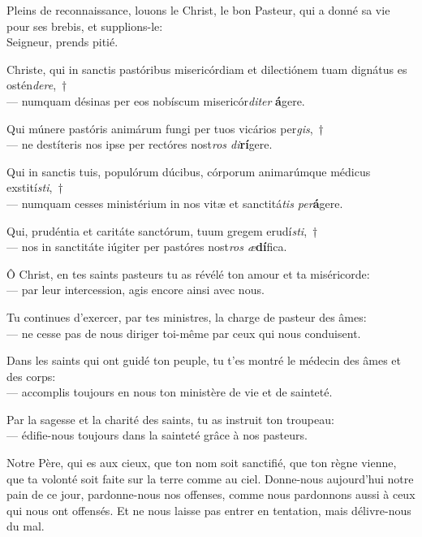 \documentclass[twoside]{article}
\begin{document}
\begin{paracol}[1]{2}
Pleins de reconnaissance, louons le Christ, le bon Pasteur, qui a
donné sa vie pour ses brebis, et supplions-le:\\

Seigneur, prends pitié.

\switchcolumn*

Christe, qui in sanctis pastóribus misericórdiam et dilectiónem tuam dignátus es ostén\textit{dere},~†\\
— numquam désinas per eos nobíscum misericór\textit{diter} \textbf{á}gere.

Qui múnere pastóris animárum fungi per tuos vicários per\textit{gis},~†\\
— ne destíteris nos ipse per rectóres nost\textit{ros di}\textbf{rí}gere.

Qui in sanctis tuis, populórum dúcibus, córporum animarúmque médicus exstití\textit{sti},~†\\
— numquam cesses ministérium in nos vitæ et sanctitá\textit{tis per}\textbf{á}gere.

Qui, prudéntia et caritáte sanctórum, tuum gregem erudí\textit{sti},~†\\
— nos in sanctitáte iúgiter per pastóres nost\textit{ros æ}\textbf{dí}fica.

\switchcolumn

Ô Christ, en tes saints pasteurs tu as révélé ton amour et ta miséricorde:\\
— par leur intercession, agis encore ainsi avec nous.

Tu continues d’exercer, par tes ministres, la charge de pasteur des âmes:\\
— ne cesse pas de nous diriger toi-même par ceux qui nous conduisent.

Dans les saints qui ont guidé ton peuple, tu t’es montré le médecin des âmes et des corps:\\
— accomplis toujours en nous ton ministère de vie et de sainteté.

Par la sagesse et la charité des saints, tu as instruit ton troupeau:\\
— édifie-nous toujours dans la sainteté grâce à nos pasteurs.

\vspace{2cm}

\switchcolumn*


\switchcolumn

Notre Père, qui es aux cieux, que ton nom soit sanctifié, que ton règne vienne, que ta volonté soit faite sur la terre comme au ciel.
Donne-nous aujourd'hui notre pain de ce jour, pardonne-nous nos offenses, comme nous pardonnons aussi
à ceux qui nous ont offensés.
Et ne nous laisse pas entrer en tentation, mais délivre-nous du mal.


\end{paracol}
\end{document}

